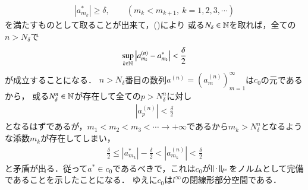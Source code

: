\begin{prf}
\begin{description}
		\begin{align}
			|a_{m_k}^*| \geq \delta, \qquad (m_k < m_{k+1},\ k= 1,2,3,\cdots)
		\end{align}
		を満たすものとして取ることが出来て，()により
		或る$N_\delta \in \mathbb{N}$を取れば，全ての$n > N_\delta$で
		\begin{align}
			\operatorname*{sup}_{k \in \mathbb{N}} \left|a_{m_k}^{(n)} - a_{m_k}^{*}\right| < \frac{\delta}{2}
		\end{align}
		が成立することになる．
		$n > N_\delta$番目の数列$a^{(n)}=\left(a_m^{(n)}\right)_{m=1}^{\infty}$は$c_0$の元であるから，
		或る$N_\delta^n \in \mathbb{N}$が存在して全ての$p > N_\delta^n$に対し
		\begin{align}
			\left|a_p^{(n)}\right| < \frac{\delta}{2}
		\end{align}
		となるはずであるが，$m_1 < m_2 < m_3 < \cdots \rightarrow +\infty$であるから$m_k > N_\delta^n$となるような添数$m_k$が存在してしまい，
		\begin{align}
			\frac{\delta}{2} \leq \left|a_{m_k}^*\right| - \frac{\delta}{2} < \left|a_{m_k}^{(n)}\right| < \frac{\delta}{2}
		\end{align}
		と矛盾が出る．従って$a^* \in c_0$であるべきで，これは$c_0$が$\left\|\, \cdot\, \right\|_{l^{\infty}}$をノルムとして完備であることを示したことになる．
		ゆえに$c_0$は$l^{\infty}$の閉線形部分空間である．
		

\end{description}
\end{prf}
